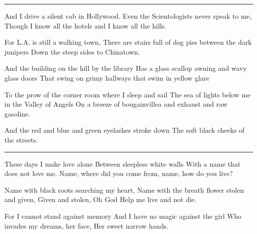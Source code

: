\documentclass[english,11pt,letterpaper,onecolumn,parskip=full]{scrbook}
\begin{document}
\begin{poem}
\begin{center}\rule[3pt]{2in}{0.5pt}\end{center}

\begin{stanza}
And I drive a silent cab in Hollywood.\verseline
Even the Scientologists never speak to me,\verseline
Though I know all the hotels and I know all the hills.
\end{stanza}

\begin{stanza}
For L.A. is still a walking town,\verseline
There are stairs full of dog piss between the dark junipers \verseline
Down the steep sides to Chinatown.
\end{stanza}

\begin{stanza}
And the building on the hill by the library\verseline
Has a glass scallop awning and wavy glass doors\verseline
That swing on grimy hallways that swim in yellow glare
\end{stanza}

\begin{stanza}
To the prow of the corner room where I sleep and sail \verseline
The sea of lights below me in the Valley of Angels\verseline
On a breeze of bougainvillea and exhaust and raw gasoline.
\end{stanza}

\begin{stanza}
And the red and blue and green eyelashes stroke down \verseline
The soft black cheeks of the streets.
\end{stanza}

\begin{center}\rule[3pt]{2in}{0.5pt}\end{center}

\begin{stanza}
These days I make love alone \verseline
Between sleepless white walls\verseline
With a name that does not love me.\verseline
Name, where did you come from, name, how do you live?
\end{stanza}

\begin{stanza}
Name with black roots searching my heart,\verseline
Name with the breath flower stolen and given,\verseline
Given and stolen, Oh God\verseline
Help me live and not die.
\end{stanza}

\begin{stanza}
For I cannot stand against memory \verseline
And I have no magic against the girl \verseline
Who invades my dreams, her face, \verseline
Her sweet narrow hands.
\end{stanza}


\end{poem}
\end{document}
